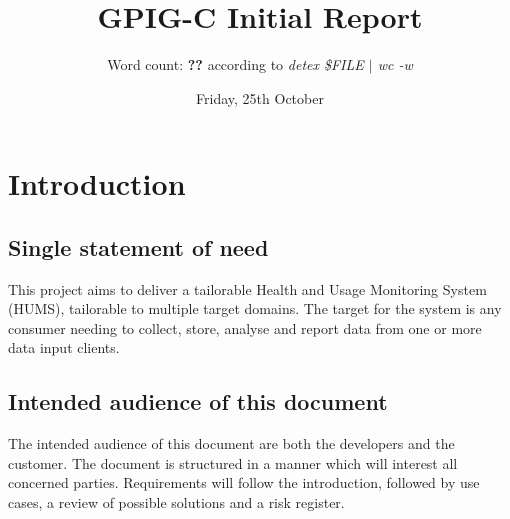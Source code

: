 \documentclass[10pt,a4paper]{article}
\begin{document}
\title{\vspace{-1cm}GPIG-C Initial Report}
\author{Word count: \textbf{??} according to \textsl{detex \$FILE $\vert$ wc -w}}
\date{Friday, 25th October}
\maketitle
\thispagestyle{fancy} %

\section{Introduction}

\subsection{Single statement of need}
This project aims to deliver a tailorable Health and Usage Monitoring System
(HUMS), tailorable to multiple target domains. The target for the system is any
consumer needing to collect, store, analyse and report data from one or more
data input clients.

\subsection{Intended audience of this document}
The intended audience of this document are both the developers and the customer.
The document is structured in a manner which will interest all concerned
parties. Requirements will follow the introduction, followed by use cases, a
review of possible solutions and a risk register.
\end{document}
